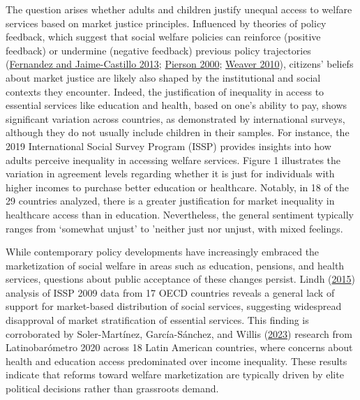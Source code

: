 \documentclass[
  letterpaper,
  DIV=11,
  numbers=noendperiod]{scrartcl}
\begin{document}
The question arises whether adults and children justify unequal access
to welfare services based on market justice principles. Influenced by
theories of policy feedback, which suggest that social welfare policies
can reinforce (positive feedback) or undermine (negative feedback)
previous policy trajectories
(\protect\hyperlink{ref-fernandez_positive_2013}{Fernandez and
Jaime-Castillo 2013};
\protect\hyperlink{ref-pierson_increasing_2000}{Pierson 2000};
\protect\hyperlink{ref-weaver_paths_2010}{Weaver 2010}), citizens'
beliefs about market justice are likely also shaped by the institutional
and social contexts they encounter. Indeed, the justification of
inequality in access to essential services like education and health,
based on one's ability to pay, shows significant variation across
countries, as demonstrated by international surveys, although they do
not usually include children in their samples. For instance, the 2019
International Social Survey Program (ISSP) provides insights into how
adults perceive inequality in accessing welfare services. Figure 1
illustrates the variation in agreement levels regarding whether it is
just for individuals with higher incomes to purchase better education or
healthcare. Notably, in 18 of the 29 countries analyzed, there is a
greater justification for market inequality in healthcare access than in
education. Nevertheless, the general sentiment typically ranges from
`somewhat unjust' to 'neither just nor unjust, with mixed feelings.

While contemporary policy developments have increasingly embraced the
marketization of social welfare in areas such as education, pensions,
and health services, questions about public acceptance of these changes
persist. Lindh (\protect\hyperlink{ref-lindh_public_2015}{2015})
analysis of ISSP 2009 data from 17 OECD countries reveals a general lack
of support for market-based distribution of social services, suggesting
widespread disapproval of market stratification of essential services.
This finding is corroborated by Soler-Martínez, García-Sánchez, and
Willis (\protect\hyperlink{ref-soler-martinez_concerns_2023}{2023})
research from Latinobarómetro 2020 across 18 Latin American countries,
where concerns about health and education access predominated over
income inequality. These results indicate that reforms toward welfare
marketization are typically driven by elite political decisions rather
than grassroots demand.~
\end{document}
